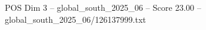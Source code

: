 \begin{textsample}{POS Dim 3 – global\_south\_2025\_06 – Score 23.00 – global\_south\_2025\_06/126137999.txt}
\end{textsample}
